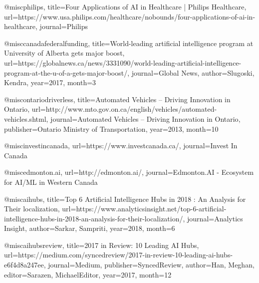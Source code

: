 @misc{philips, title={Four Applications of AI in Healthcare | Philips Healthcare}, url={https://www.usa.philips.com/healthcare/nobounds/four-applications-of-ai-in-healthcare}, journal={Philips}} 

@misc{canadafederalfunding, title={World-leading artificial intelligence program at University of Alberta gets major boost}, url={https://globalnews.ca/news/3331090/world-leading-artificial-intelligence-program-at-the-u-of-a-gets-major-boost/}, journal={Global News}, author={Slugoski, Kendra}, year={2017}, month=3} 

@misc{ontariodriverless, title={Automated Vehicles – Driving Innovation in Ontario}, url={http://www.mto.gov.on.ca/english/vehicles/automated-vehicles.shtml}, journal={Automated Vehicles – Driving Innovation in Ontario}, publisher={Ontario Ministry of Transportation}, year={2013}, month=10} 

@misc{investincanada, url={https://www.investcanada.ca/}, journal={Invest In Canada}} 

@misc{edmonton.ai, url={http://edmonton.ai/}, journal={Edmonton.AI - Ecosystem for AI/ML in Western Canada}} 

@misc{aihubs, title={Top 6 Artificial Intelligence Hubs in 2018 : An Analysis for Their localization}, url={https://www.analyticsinsight.net/top-6-artificial-intelligence-hubs-in-2018-an-analysis-for-their-localization/}, journal={Analytics Insight}, author={Sarkar, Sampriti}, year={2018}, month=6} 


@misc{aihubsreview, title={2017 in Review: 10 Leading AI Hubs}, url={https://medium.com/syncedreview/2017-in-review-10-leading-ai-hubs-e6f4d8a247ee}, journal={Medium}, publisher={SyncedReview}, author={Han, Meghan}, editor={Sarazen, MichaelEditor}, year={2017}, month=12}
